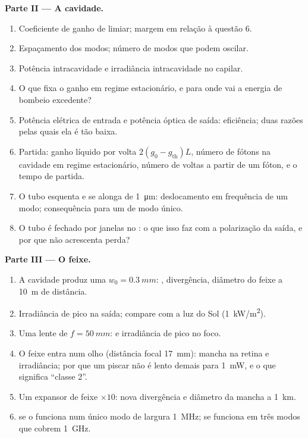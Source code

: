 \begin{problem}
\textbf{Parte II --- A cavidade.}
\begin{enumerate}[resume]
  \item Coeficiente de ganho de limiar; margem em relação à questão 6.
  \item Espaçamento dos modos; número de modos que podem oscilar.
  \item Potência intracavidade e irradiância intracavidade no capilar.
  \item O que fixa o ganho em regime estacionário, e para onde vai a energia
        de bombeio excedente?
  \item Potência elétrica de entrada e potência óptica de saída: eficiência; duas
        razões pelas quais ela é tão baixa.
  \item Partida: ganho líquido por volta $2(g_0 - g_{\text{th}})L$,
        número de fótons na cavidade em regime estacionário, número de
        voltas a partir de um fóton, e o tempo de partida.
  \item O tubo esquenta e se alonga de \qty{1}{\micro m}: deslocamento em frequência
        de um modo; consequência para um  de modo único.
  \item O tubo é fechado por janelas no : o que isso
        faz com a polarização da saída, e por que não
        acrescenta perda?
\end{enumerate}

\textbf{Parte III --- O feixe.}
\begin{enumerate}[resume]
  \item A cavidade produz uma  $w_0 = \qty{0.3}{mm}$: , divergência, diâmetro do feixe a \qty{10}{m} de distância.
  \item Irradiância de pico na saída; compare com a luz do Sol
        (\qty{1}{kW/m^2}).
  \item Uma lente de $f = \qty{50}{mm}$:  e irradiância de pico no
        foco.
  \item O feixe entra num olho (distância focal \qty{17}{mm}): mancha na retina
        e irradiância; por que um piscar não é lento demais para \qty{1}{mW},
        e o que significa ``classe 2''.
  \item Um expansor de feixe $\times 10$: nova divergência e diâmetro da mancha
        a \qty{1}{km}.
  \item {} se o  funciona num único modo de largura
        \qty{1}{MHz}; se funciona em três modos que cobrem \qty{1}{GHz}.
\end{enumerate}


\end{problem}
